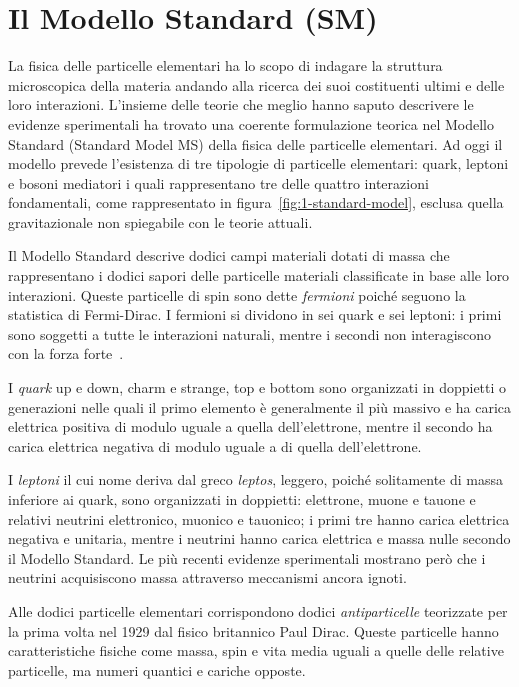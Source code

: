 \section{Il Modello Standard (SM)}
\label{sec:SM}
    La fisica delle particelle elementari ha lo scopo di indagare la struttura microscopica della materia andando alla ricerca dei suoi costituenti ultimi e delle loro interazioni. L'insieme delle teorie che meglio hanno saputo descrivere le evidenze sperimentali ha trovato una coerente formulazione teorica nel Modello Standard (Standard Model MS) della fisica delle particelle elementari. Ad oggi il modello prevede l'esistenza di tre tipologie di particelle elementari: quark, leptoni e bosoni mediatori i quali rappresentano tre delle quattro interazioni fondamentali, come rappresentato in figura~\ref{fig:1-standard-model}, esclusa quella gravitazionale non spiegabile con le teorie attuali.
    
    Il Modello Standard descrive dodici campi materiali dotati di massa che rappresentano i dodici sapori delle particelle materiali classificate in base alle loro interazioni. Queste particelle di spin  sono dette \textit{fermioni} poiché seguono la statistica di Fermi-Dirac. I fermioni si dividono in sei quark e sei leptoni: i primi sono soggetti a tutte le interazioni naturali, mentre i secondi non interagiscono con la forza forte~\cite{CG_2007}.
    
    I \textit{quark} up e down, charm e strange, top e bottom sono organizzati in doppietti o generazioni nelle quali il primo elemento è generalmente il più massivo e ha carica elettrica positiva di modulo uguale a  quella dell'elettrone, mentre il secondo ha carica elettrica negativa di modulo uguale a  di quella dell'elettrone.

    I \textit{leptoni} il cui nome deriva dal greco \textit{leptos}, leggero, poiché solitamente di massa inferiore ai quark, sono organizzati in doppietti: elettrone, muone e tauone e relativi neutrini elettronico, muonico e tauonico; i primi tre hanno carica elettrica negativa e unitaria, mentre i neutrini hanno carica elettrica e massa nulle secondo il Modello Standard. Le più recenti evidenze sperimentali mostrano però che i neutrini acquisiscono massa attraverso meccanismi ancora ignoti.

    Alle dodici particelle elementari corrispondono dodici \textit{antiparticelle} teorizzate per la prima volta nel 1929 dal fisico britannico Paul Dirac. Queste particelle hanno caratteristiche fisiche come massa, spin e vita media uguali a quelle delle relative particelle, ma numeri quantici e cariche opposte.

